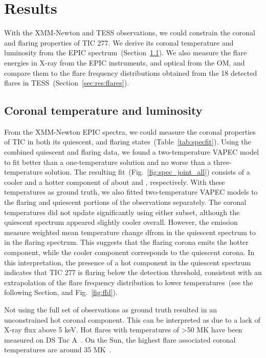 \documentclass[twocolumn]{aastex631}
\begin{document}
\section{Results}

With the XMM-Newton and TESS observations, we could constrain the coronal and flaring properties of TIC 277. We derive its coronal temperature and luminosity from the EPIC spectrum~(Section~\ref{sec:res:XrayTL}). We also measure the flare energies in X-ray from the EPIC instruments, and optical from the OM, and compare them to the flare frequency distributions obtained from the 18 detected flares in TESS~(Section~\ref{sec:res:flares}).


\subsection{Coronal temperature and luminosity}
\label{sec:res:XrayTL}

From the XMM-Newton EPIC spectra, we could measure the coronal properties of TIC in both its quiescent, and flaring states~(Table~\ref{tab:specfit}). Using the combined quiescent and flaring data, we found a two-temperature VAPEC model to fit better than a one-temperature solution and no worse than a three-temperature solution. The resulting fit~(Fig.~\ref{fig:spec_joint_all}) consists of a cooler and a hotter component of about \Tcool and \Thot, respectively. With these temperatures as ground truth, we also fitted two-temperature VAPEC models to the flaring and quiescent portions of the observations separately. The coronal temperatures did not update significantly using either subset, although the quiescent spectrum appeared slightly cooler overall. However, the emission measure weighted mean temperature change dfrom \Tqmean in the quiescent spectrum to \Tfmean in the flaring spectrum. This suggests that the flaring corona emits the hotter component, while the cooler component corresponds to the quiescent corona. In this interpretation, the presence of a hot component in the quiescent spectrum indicates that TIC 277 is flaring below the detection threshold, consistent with an extrapolation of the flare frequency distribution to lower temperatures~(see the following Section, and Fig.~\ref{fig:ffd}). 

Not using the full set of observations as ground truth resulted in an unconstrained hot coronal component. This can be interpreted as due to a lack of X-ray flux above 5 keV. Hot flares with temperatures of >50 MK have been measured on DS Tuc A~\citep{pillitteri2011xray}. On the Sun, the highest flare associated coronal temperatures are around 35 MK~\citep{kay2003soft}.
\end{document}
